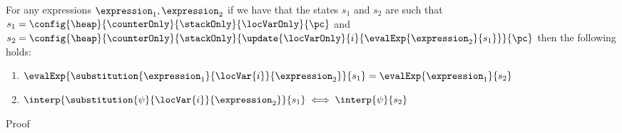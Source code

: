 \begin{substLv}\label{substLv}
For any expressions $ \expression_1, \expression_2 $ 
if we have that the states $s_1$ and $s_2$ are such that
$ s_1 =   \config{\heap}{\counterOnly}{ \stackOnly }{\locVarOnly}{\pc }$ and 
$ s_2 =   \config{\heap}{\counterOnly }{ \stackOnly }{\update{\locVarOnly}{i}{ \evalExp{ \expression_2}{ s_1 } }}{\pc }  $ then 
the following holds:
\begin{enumerate}
      \item $\evalExp{\substitution{\expression_1}{ \locVar{i} }{ \expression_2 }}{ s_1 } = \evalExp{\expression_1}{s_2} $
      \item $\interp{\substitution{\psi}{ \locVar{i} }{ \expression_2 }}{ s_1 } \iff \interp{\psi}{s_2} $
\end{enumerate}
\end{substLv}
Proof 
